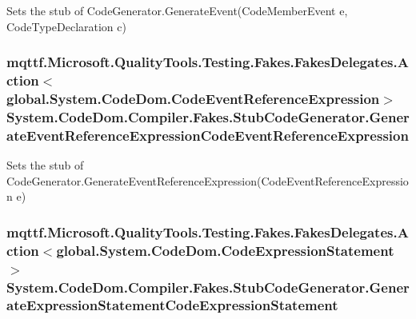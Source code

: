 Sets the stub of Code\-Generator.\-Generate\-Event(\-Code\-Member\-Event e, Code\-Type\-Declaration c)

\hypertarget{class_system_1_1_code_dom_1_1_compiler_1_1_fakes_1_1_stub_code_generator_a498fa79f343b3d3cddf032aed1e399f7}{
\subsubsection[{Generate\-Event\-Reference\-Expression\-Code\-Event\-Reference\-Expression}]{\setlength{\rightskip}{0pt plus 5cm}mqttf.\-Microsoft.\-Quality\-Tools.\-Testing.\-Fakes.\-Fakes\-Delegates.\-Action$<$global.\-System.\-Code\-Dom.\-Code\-Event\-Reference\-Expression$>$ System.\-Code\-Dom.\-Compiler.\-Fakes.\-Stub\-Code\-Generator.\-Generate\-Event\-Reference\-Expression\-Code\-Event\-Reference\-Expression}}\label{class_system_1_1_code_dom_1_1_compiler_1_1_fakes_1_1_stub_code_generator_a498fa79f343b3d3cddf032aed1e399f7}


Sets the stub of Code\-Generator.\-Generate\-Event\-Reference\-Expression(\-Code\-Event\-Reference\-Expression e)

\hypertarget{class_system_1_1_code_dom_1_1_compiler_1_1_fakes_1_1_stub_code_generator_a7d8cb34c5c19ce32634862a9ee2238dc}{
\subsubsection[{Generate\-Expression\-Statement\-Code\-Expression\-Statement}]{\setlength{\rightskip}{0pt plus 5cm}mqttf.\-Microsoft.\-Quality\-Tools.\-Testing.\-Fakes.\-Fakes\-Delegates.\-Action$<$global.\-System.\-Code\-Dom.\-Code\-Expression\-Statement$>$ System.\-Code\-Dom.\-Compiler.\-Fakes.\-Stub\-Code\-Generator.\-Generate\-Expression\-Statement\-Code\-Expression\-Statement}}\label{class_system_1_1_code_dom_1_1_compiler_1_1_fakes_1_1_stub_code_generator_a7d8cb34c5c19ce32634862a9ee2238dc}


